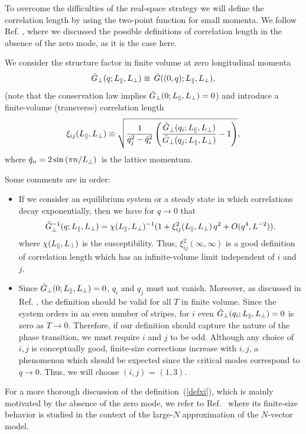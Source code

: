 \documentclass[12pt]{article}
\begin{document}
To overcome the difficulties of the real-space strategy we will define
the correlation length
by using  the two-point function for small momenta. We follow
Ref. \cite{correlation_length}, where we discussed the possible 
definitions of correlation length in the absence of the zero mode, 
as it is the case here. 

We consider the structure factor in finite volume
at zero longitudinal momenta
\begin{equation}
        \tilde{G}_{\bot}(q; L_{\|}, L_{\bot}) \equiv\, 
           {\tilde{G}}((0,q); 
        L_{\|}, L_{\bot}) ,
\end{equation}
(note that the conservation law 
implies $\tilde{G}_{\bot}(0; L_{\|}, L_{\bot})=0$)
and introduce a finite-volume (transverse) correlation length
\begin{equation}
\label{defxi}
        {\xi}_{ij}(L_{\|}, L_{\bot}) \equiv
        \sqrt{\frac{1}{\hat{q}_{j}^{2} - \hat{q}_{i}^{2}}
        \left( 
\frac{\tilde{G}_{\bot}(q_{i}; L_{\|}, L_{\bot})}{
        \tilde{G}_{\bot}(q_{j}; L_{\|},
        L_{\bot})} -1\right) },
\end{equation}
where $\hat{q}_{n}=2\sin{(\pi n/L_{\bot})}$\ is the lattice momentum.

Some comments are in order:
\begin{itemize}
\item[(i)]
If we consider an equilibrium system or a steady state in which 
correlations decay exponentially, then we have for $q\to 0$ that
\begin{equation}
        \tilde{G}_{\bot}^{-1}(q; L_{\|}, L_{\bot}) = 
        \chi(L_{\|}, L_{\bot})^{-1}
        (  1 + {\xi}^{2}_{ij}(L_{\|}, L_{\bot})\, q^{2}+ O(q^{4},L^{-2})).
\label{eq:skel}
\end{equation}
where $\chi(L_{\|}, L_{\bot})$ is the susceptibility. Thus,
${\xi}^{2}_{ij}(\infty,\infty)$ is a good definition of 
correlation length which has an infinite-volume limit
independent of $i$ and $j$.

\item[(ii)] Since $\tilde{G}_{\bot}(0; L_{\|}, L_{\bot})=0$,
  $q_i$ and $q_j$ must not vanish. Moreover, 
  as discussed in Ref. \cite{correlation_length}, the definition
should be valid for all $T$ in finite volume. Since the system orders in an 
even number of stripes, for $i$ even $\tilde{G}_{\bot}(q_i; L_{\|}, L_{\bot})=0$ 
is zero as $T\to 0$. Therefore, if our definition should capture 
the nature of the phase transition, we must require $i$ and $j$ to be odd.
Although any choice of $i,j$ is conceptually good, 
finite-size corrections increase with $i,j$, a phenomenon which should 
be expected since the critical modes correspond to 
$q\to 0$. Thus, we will choose $(i,j)$ = $(1,3)$. 
\end{itemize}
For a more thorough discussion of the definition~(\ref{defxi}), which
is mainly motivated by the absence of the zero mode,  we
refer to Ref.~\cite{correlation_length} where its finite-size behavior  is
studied in the context of the large-$N$ approximation of the $N$-vector
model.
\end{document}
